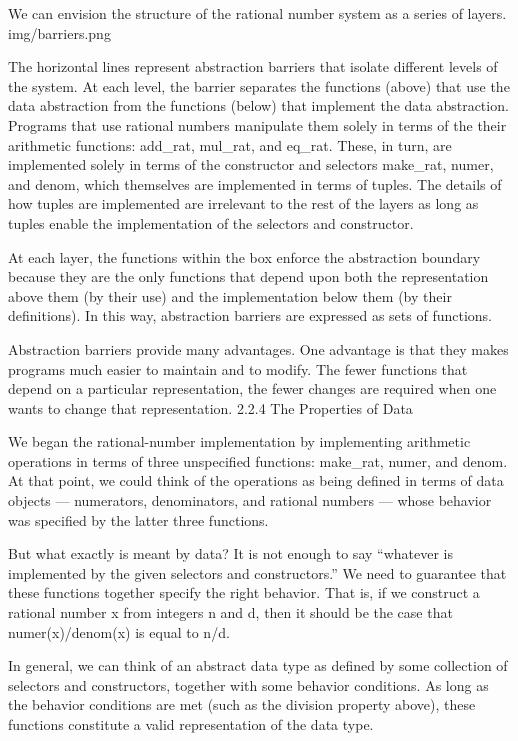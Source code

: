 \documentclass[letterpaper,10pt,dvipdfmx]{sphinxmanual}
\begin{document}
We can envision the structure of the rational number system as a series of layers.
img/barriers.png

The horizontal lines represent abstraction barriers that isolate different levels of the system. At each level, the barrier separates the functions (above) that use the data abstraction from the functions (below) that implement the data abstraction. Programs that use rational numbers manipulate them solely in terms of the their arithmetic functions: add\_rat, mul\_rat, and eq\_rat. These, in turn, are implemented solely in terms of the constructor and selectors make\_rat, numer, and denom, which themselves are implemented in terms of tuples. The details of how tuples are implemented are irrelevant to the rest of the layers as long as tuples enable the implementation of the selectors and constructor.

At each layer, the functions within the box enforce the abstraction boundary because they are the only functions that depend upon both the representation above them (by their use) and the implementation below them (by their definitions). In this way, abstraction barriers are expressed as sets of functions.

Abstraction barriers provide many advantages. One advantage is that they makes programs much easier to maintain and to modify. The fewer functions that depend on a particular representation, the fewer changes are required when one wants to change that representation.
2.2.4   The Properties of Data

We began the rational-number implementation by implementing arithmetic operations in terms of three unspecified functions: make\_rat, numer, and denom. At that point, we could think of the operations as being defined in terms of data objects --- numerators, denominators, and rational numbers --- whose behavior was specified by the latter three functions.

But what exactly is meant by data? It is not enough to say ``whatever is implemented by the given selectors and constructors.'' We need to guarantee that these functions together specify the right behavior. That is, if we construct a rational number x from integers n and d, then it should be the case that numer(x)/denom(x) is equal to n/d.

In general, we can think of an abstract data type as defined by some collection of selectors and constructors, together with some behavior conditions. As long as the behavior conditions are met (such as the division property above), these functions constitute a valid representation of the data type.
\end{document}
